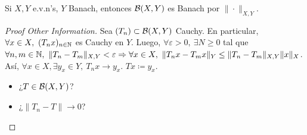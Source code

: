 \begin{prop}
	Si $X,Y$ e.v.n's, $Y$ Banach, entonces $\mathcal{B}(X,Y)$ es Banach por $\| \cdot \|_{X,Y}$.
\end{prop}
\begin{proof}[Proof Other Information]
	Sea $(T_{n}) \subset \mathcal{B}(X,Y)$ Cauchy. En particular, $\forall x \in X,\ (T_{n} x)_{n \in \mathbb{N}}$ es Cauchy en $Y$. Luego, $\forall \varepsilon > 0,\ \exists N \geq 0$ tal que $\forall n,m \in \mathbb{N},\ \| T_{n} - T_{m} \|_{X,Y} < \varepsilon \Rightarrow \forall x \in X,\ \| T_{n} x - T_{m} x \|_{Y} \leq \| T_{n} - T_{m} \|_{X,Y} \| x \|_{X}$. Así, $\forall x \in X, \exists y_{x} \in Y,\ T_{n} x \longrightarrow y_{x}$. $Tx \coloneq y_{x}$.
	\begin{itemize}
		\item ¿$T \in \mathcal{B}(X,Y)$?

		\item ¿$\| T_{n} - T \| \longrightarrow 0$?
	\end{itemize}
\end{proof}
